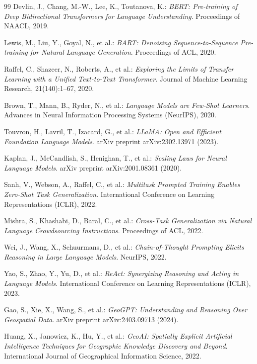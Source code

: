 \documentclass[a4paper,fleqn]{cas-sc}
\begin{document}
\begin{thebibliography}{99}
Devlin, J., Chang, M.-W., Lee, K., Toutanova, K.:
\textit{BERT: Pre-training of Deep Bidirectional Transformers for Language Understanding}. 
Proceedings of NAACL, 2019.

Lewis, M., Liu, Y., Goyal, N., et al.:
\textit{BART: Denoising Sequence-to-Sequence Pre-training for Natural Language Generation}. 
Proceedings of ACL, 2020.

Raffel, C., Shazeer, N., Roberts, A., et al.:
\textit{Exploring the Limits of Transfer Learning with a Unified Text-to-Text Transformer}. 
Journal of Machine Learning Research, 21(140):1–67, 2020.

Brown, T., Mann, B., Ryder, N., et al.:
\textit{Language Models are Few-Shot Learners}. 
Advances in Neural Information Processing Systems (NeurIPS), 2020.

Touvron, H., Lavril, T., Izacard, G., et al.:
\textit{LLaMA: Open and Efficient Foundation Language Models}. 
arXiv preprint arXiv:2302.13971 (2023).

Kaplan, J., McCandlish, S., Henighan, T., et al.:
\textit{Scaling Laws for Neural Language Models}. 
arXiv preprint arXiv:2001.08361 (2020).

Sanh, V., Webson, A., Raffel, C., et al.:
\textit{Multitask Prompted Training Enables Zero-Shot Task Generalization}. 
International Conference on Learning Representations (ICLR), 2022.

Mishra, S., Khashabi, D., Baral, C., et al.:
\textit{Cross-Task Generalization via Natural Language Crowdsourcing Instructions}. 
Proceedings of ACL, 2022.

Wei, J., Wang, X., Schuurmans, D., et al.:
\textit{Chain-of-Thought Prompting Elicits Reasoning in Large Language Models}. 
NeurIPS, 2022.

Yao, S., Zhao, Y., Yu, D., et al.:
\textit{ReAct: Synergizing Reasoning and Acting in Language Models}. 
International Conference on Learning Representations (ICLR), 2023.

Gao, S., Xie, X., Wang, S., et al.:
\textit{GeoGPT: Understanding and Reasoning Over Geospatial Data}. 
arXiv preprint arXiv:2403.09713 (2024).

Huang, X., Janowicz, K., Hu, Y., et al.:
\textit{GeoAI: Spatially Explicit Artificial Intelligence Techniques for Geographic Knowledge Discovery and Beyond}. 
International Journal of Geographical Information Science, 2022.


\end{thebibliography}
\end{document}
